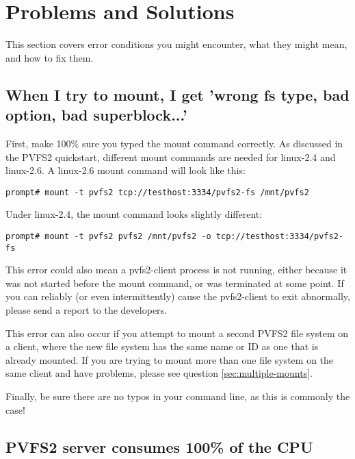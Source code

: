 \documentclass[11pt,letterpaper]{article}
\begin{document}
%
%

\section{Problems and Solutions}
This section covers error conditions you might encounter, what they might mean,
and how to fix them.

\subsection{When I try to mount, I get 'wrong fs type, bad option, bad
superblock...'}

First, make 100\% sure you typed the mount command correctly. As discussed in
the PVFS2 quickstart, different mount commands are needed for linux-2.4 and
linux-2.6.  A linux-2.6 mount command will look like this: 

\begin{verbatim}
prompt# mount -t pvfs2 tcp://testhost:3334/pvfs2-fs /mnt/pvfs2
\end{verbatim}

Under linux-2.4, the mount command looks slightly different:
\begin{verbatim}
prompt# mount -t pvfs2 pvfs2 /mnt/pvfs2 -o tcp://testhost:3334/pvfs2-fs
\end{verbatim}

This error could also mean a pvfs2-client process is not running,
either because it was not started before the mount command, or was
terminated at some point. If you can reliably (or even intermittently)
cause the pvfs2-client to exit abnormally, please send a report to the
developers.

This error can also occur if you attempt to mount a second PVFS2 file system
on a client, where the new file system has the same name or ID as one
that is already mounted.  If you are trying to mount more than one file system
on the same client and have problems, please see question
\ref{sec:multiple-mounts}.

Finally, be sure there are no typos in your command line, as this is
commonly the case!

\subsection{PVFS2 server consumes 100\% of the CPU}
\label{sec:server_100pct_cpu}
\end{document}
